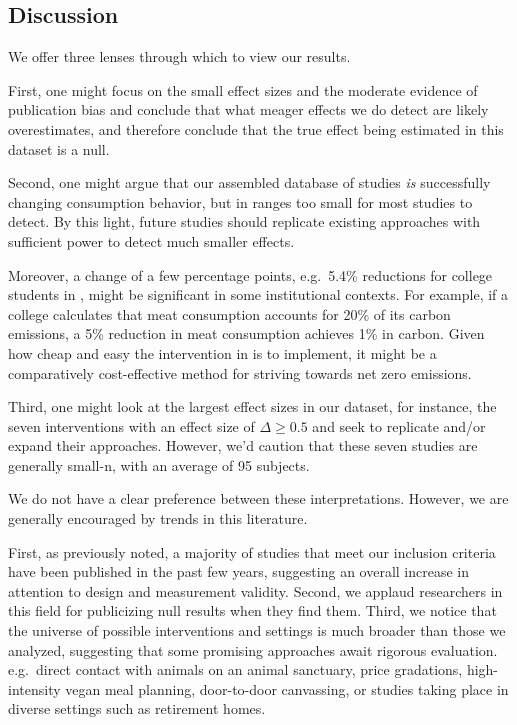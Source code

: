 \documentclass[sn-nature,pdflatex]{sn-jnl}
\begin{document}
\subsection{Discussion}\label{discussion}

We offer three lenses through which to view our results.

First, one might focus on the small effect sizes and the moderate
evidence of publication bias and conclude that what meager effects we do
detect are likely overestimates, and therefore conclude that the true
effect being estimated in this dataset is a null.

Second, one might argue that our assembled database of studies \emph{is}
successfully changing consumption behavior, but in ranges too small for
most studies to detect. By this light, future studies should replicate
existing approaches with sufficient power to detect much smaller
effects.

Moreover, a change of a few percentage points, e.g.~5.4\% reductions for
college students in \citep{jalil2023}, might be significant in some
institutional contexts. For example, if a college calculates that meat
consumption accounts for 20\% of its carbon emissions, a 5\% reduction
in meat consumption achieves 1\% in carbon. Given how cheap and easy the
intervention in \citep{jalil2023} is to implement, it might be a
comparatively cost-effective method for striving towards net zero
emissions.

Third, one might look at the largest effect sizes in our dataset, for
instance, the seven interventions with an effect size of
\(\Delta \geq 0.5\)
\citep{bianchi2022, carfora2023, merrill2009, piester2020} and seek to
replicate and/or expand their approaches. However, we'd caution that
these seven studies are generally small-n, with an average of 95
subjects.

We do not have a clear preference between these interpretations.
However, we are generally encouraged by trends in this literature.

First, as previously noted, a majority of studies that meet our
inclusion criteria have been published in the past few years, suggesting
an overall increase in attention to design and measurement validity.
Second, we applaud researchers in this field for publicizing null
results when they find them. Third, we notice that the universe of
possible interventions and settings is much broader than those we
analyzed, suggesting that some promising approaches await rigorous
evaluation. e.g.~direct contact with animals on an animal sanctuary,
price gradations, high-intensity vegan meal planning, door-to-door
canvassing, or studies taking place in diverse settings such as
retirement homes.
\end{document}
